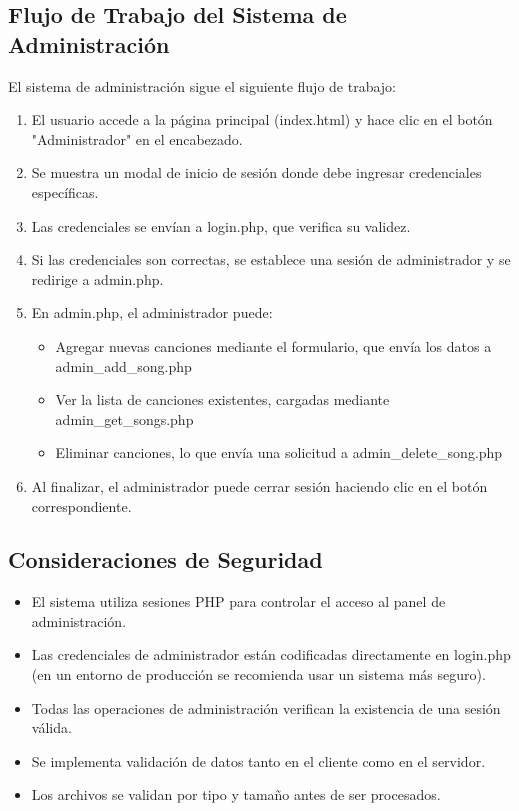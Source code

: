 \documentclass[a4paper,12pt]{article}
\begin{document}
\subsection{Flujo de Trabajo del Sistema de Administración}
El sistema de administración sigue el siguiente flujo de trabajo:

\begin{enumerate}
    \item El usuario accede a la página principal (index.html) y hace clic en el botón "Administrador" en el encabezado.
    \item Se muestra un modal de inicio de sesión donde debe ingresar credenciales específicas.
    \item Las credenciales se envían a login.php, que verifica su validez.
    \item Si las credenciales son correctas, se establece una sesión de administrador y se redirige a admin.php.
    \item En admin.php, el administrador puede:
    \begin{itemize}
        \item Agregar nuevas canciones mediante el formulario, que envía los datos a admin\_add\_song.php
        \item Ver la lista de canciones existentes, cargadas mediante admin\_get\_songs.php
        \item Eliminar canciones, lo que envía una solicitud a admin\_delete\_song.php
    \end{itemize}
    \item Al finalizar, el administrador puede cerrar sesión haciendo clic en el botón correspondiente.
\end{enumerate}

\subsection{Consideraciones de Seguridad}
\begin{itemize}
    \item El sistema utiliza sesiones PHP para controlar el acceso al panel de administración.
    \item Las credenciales de administrador están codificadas directamente en login.php (en un entorno de producción se recomienda usar un sistema más seguro).
    \item Todas las operaciones de administración verifican la existencia de una sesión válida.
    \item Se implementa validación de datos tanto en el cliente como en el servidor.
    \item Los archivos se validan por tipo y tamaño antes de ser procesados.
\end{itemize}
\end{document}
